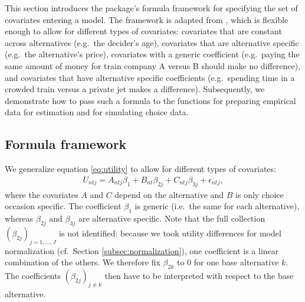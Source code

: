 \documentclass[article]{jss}
\newcommand{\fct}[1]{\code{#1()}}
\begin{document}
This section introduces the package's formula framework for specifying the set of covariates entering a model. The framework is adapted from , which is flexible enough to allow for different types of covariates: covariates that are constant across alternatives (e.g.\ the decider's age), covariates that are alternative specific (e.g.\ the alternative's price), covariates with a generic coefficient (e.g.\ paying the same amount of money for train company A versus B should make no difference), and covariates that have alternative specific coefficients (e.g.\ spending time in a crowded train versus a private jet makes a difference). Subsequently, we demonstrate how to pass such a formula to the functions \fct{prepare\_data} for preparing empirical data for estimation and \fct{simulate\_choices} for simulating choice data.

\subsection{Formula framework} \label{subsec:formula}

We generalize equation \eqref{eq:utility} to allow for different types of covariates:
\begin{align}
  \label{eq:utility_gen}
  U_{ntj} = A_{ntj} \beta_1 + B_{nt} \beta_{2j} + C_{ntj} \beta_{3j} + \epsilon_{ntj},
\end{align}
where the covariates $A$ and $C$ depend on the alternative and $B$ is only choice occasion specific. The coefficient $\beta_1$ is generic (i.e.\ the same for each alternative), whereas $\beta_{2j}$ and $\beta_{3j}$ are alternative specific. Note that the full collection $(\beta_{2j})_{j=1,\dots,J}$ is not identified: because we took utility differences for model normalization (cf.\ Section \ref{subsec:normalization}), one coefficient is a linear combination of the others. We therefore fix $\beta_{2k}$ to 0 for one base alternative $k$. The coefficients $(\beta_{2j})_{j\neq k}$ then have to be interpreted with respect to the base alternative.
\end{document}
